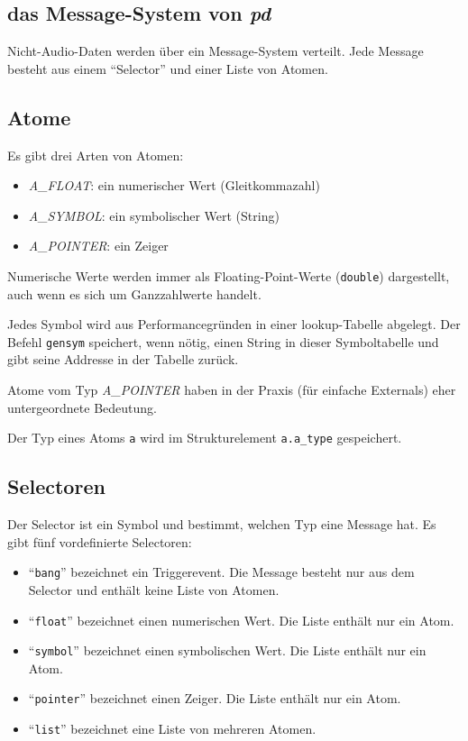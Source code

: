 \documentclass[12pt, a4paper,austrian, titlepage]{article}
\begin{document}
\vfill
\newpage
\begin{appendix}

\section{das Message-System von \em pd}
Nicht-Audio-Daten werden über ein Message-System verteilt.
Jede Message besteht aus einem ``Selector'' und einer Liste von Atomen.

\subsection{Atome}

Es gibt drei Arten von Atomen:
\begin{itemize}
\item {\em A\_FLOAT}: ein numerischer Wert (Gleitkommazahl)
\item {\em A\_SYMBOL}: ein symbolischer Wert (String)
\item {\em A\_POINTER}: ein Zeiger
\end{itemize}

Numerische Werte werden immer als Floating-Point-Werte (\verb+double+) dargestellt,
auch wenn es sich um Ganzzahlwerte handelt.

Jedes Symbol wird aus Performancegründen in einer lookup-Tabelle abgelegt.
Der Befehl \verb+gensym+ speichert, wenn nötig,
einen String in dieser Symboltabelle und gibt seine Addresse in der Tabelle zurück.

Atome vom Typ {\em A\_POINTER} haben in der Praxis
(für einfache Externals) eher untergeordnete Bedeutung.

Der Typ eines Atoms \verb+a+ wird im Strukturelement \verb+a.a_type+ gespeichert.

\subsection{Selectoren}

Der Selector ist ein Symbol und bestimmt, welchen Typ eine Message hat.
Es gibt fünf vordefinierte Selectoren:
\begin{itemize}
\item ``{\tt bang}'' bezeichnet ein Triggerevent.
Die Message besteht nur aus dem Selector und enthält keine Liste von Atomen.
\item ``{\tt float}'' bezeichnet einen numerischen Wert. Die Liste enthält nur ein Atom.
\item ``{\tt symbol}'' bezeichnet einen symbolischen Wert. Die Liste enthält nur ein Atom.
\item ``{\tt pointer}'' bezeichnet einen Zeiger. Die Liste enthält nur ein Atom.
\item ``{\tt list}'' bezeichnet eine Liste von mehreren Atomen.
\end{itemize}


\end{appendix}
\end{document}
